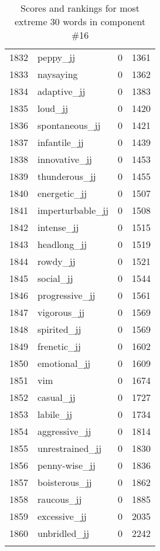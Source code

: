 \begin{longtable}[!htbp]{| rlr@{.}l |}
    1832 & peppy\_jj & 0 & 1361 \\
    1833 & naysaying & 0 & 1362 \\
    1834 & adaptive\_jj & 0 & 1383 \\
    1835 & loud\_jj & 0 & 1420 \\
    1836 & spontaneous\_jj & 0 & 1421 \\
    1837 & infantile\_jj & 0 & 1439 \\
    1838 & innovative\_jj & 0 & 1453 \\
    1839 & thunderous\_jj & 0 & 1455 \\
    1840 & energetic\_jj & 0 & 1507 \\
    1841 & imperturbable\_jj & 0 & 1508 \\
    1842 & intense\_jj & 0 & 1515 \\
    1843 & headlong\_jj & 0 & 1519 \\
    1844 & rowdy\_jj & 0 & 1521 \\
    1845 & social\_jj & 0 & 1544 \\
    1846 & progressive\_jj & 0 & 1561 \\
    1847 & vigorous\_jj & 0 & 1569 \\
    1848 & spirited\_jj & 0 & 1569 \\
    1849 & frenetic\_jj & 0 & 1602 \\
    1850 & emotional\_jj & 0 & 1609 \\
    1851 & vim & 0 & 1674 \\
    1852 & casual\_jj & 0 & 1727 \\
    1853 & labile\_jj & 0 & 1734 \\
    1854 & aggressive\_jj & 0 & 1814 \\
    1855 & unrestrained\_jj & 0 & 1830 \\
    1856 & penny-wise\_jj & 0 & 1836 \\
    1857 & boisterous\_jj & 0 & 1862 \\
    1858 & raucous\_jj & 0 & 1885 \\
    1859 & excessive\_jj & 0 & 2035 \\
    1860 & unbridled\_jj & 0 & 2242 \\
    \hline
    \caption{Scores and rankings for most extreme 30 words in component \#16} \\
\end{longtable}
